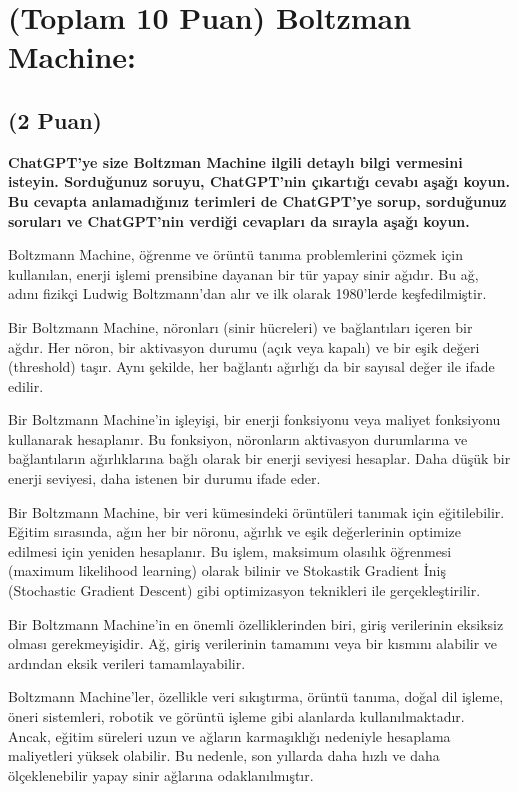\documentclass[11pt]{article}
\begin{document}
\section{(Toplam 10 Puan) Boltzman Machine:}

\subsection{(2 Puan)} \textbf{ChatGPT’ye size Boltzman Machine ilgili detaylı bilgi vermesini isteyin. Sorduğunuz soruyu, ChatGPT'nin çıkartığı cevabı aşağı koyun. Bu cevapta anlamadığınız terimleri de ChatGPT’ye sorup, sorduğunuz soruları ve ChatGPT’nin verdiği cevapları da sırayla aşağı koyun.}

Boltzmann Machine, öğrenme ve örüntü tanıma problemlerini çözmek için kullanılan, enerji işlemi prensibine dayanan bir tür yapay sinir ağıdır. Bu ağ, adını fizikçi Ludwig Boltzmann'dan alır ve ilk olarak 1980'lerde keşfedilmiştir.

Bir Boltzmann Machine, nöronları (sinir hücreleri) ve bağlantıları içeren bir ağdır. Her nöron, bir aktivasyon durumu (açık veya kapalı) ve bir eşik değeri (threshold) taşır. Aynı şekilde, her bağlantı ağırlığı da bir sayısal değer ile ifade edilir.

Bir Boltzmann Machine'in işleyişi, bir enerji fonksiyonu veya maliyet fonksiyonu kullanarak hesaplanır. Bu fonksiyon, nöronların aktivasyon durumlarına ve bağlantıların ağırlıklarına bağlı olarak bir enerji seviyesi hesaplar. Daha düşük bir enerji seviyesi, daha istenen bir durumu ifade eder.

Bir Boltzmann Machine, bir veri kümesindeki örüntüleri tanımak için eğitilebilir. Eğitim sırasında, ağın her bir nöronu, ağırlık ve eşik değerlerinin optimize edilmesi için yeniden hesaplanır. Bu işlem, maksimum olasılık öğrenmesi (maximum likelihood learning) olarak bilinir ve Stokastik Gradient İniş (Stochastic Gradient Descent) gibi optimizasyon teknikleri ile gerçekleştirilir.

Bir Boltzmann Machine'in en önemli özelliklerinden biri, giriş verilerinin eksiksiz olması gerekmeyişidir. Ağ, giriş verilerinin tamamını veya bir kısmını alabilir ve ardından eksik verileri tamamlayabilir.

Boltzmann Machine'ler, özellikle veri sıkıştırma, örüntü tanıma, doğal dil işleme, öneri sistemleri, robotik ve görüntü işleme gibi alanlarda kullanılmaktadır. Ancak, eğitim süreleri uzun ve ağların karmaşıklığı nedeniyle hesaplama maliyetleri yüksek olabilir. Bu nedenle, son yıllarda daha hızlı ve daha ölçeklenebilir yapay sinir ağlarına odaklanılmıştır.
\end{document}
